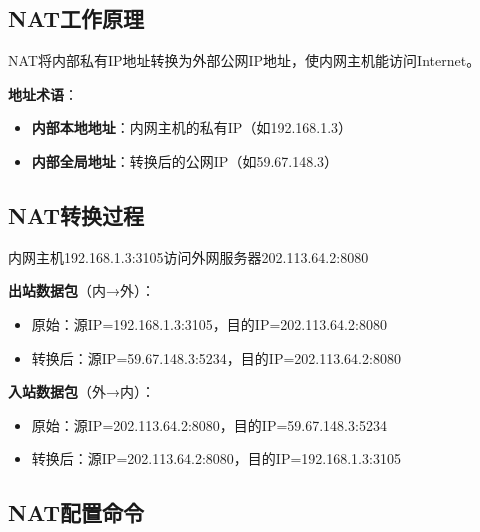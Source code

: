 \documentclass[12pt,a4paper]{ctexart}
\begin{document}
\subsection{NAT工作原理}

\begin{keybox}
NAT将内部私有IP地址转换为外部公网IP地址，使内网主机能访问Internet。

\textbf{地址术语}：
\begin{itemize}[itemsep=0pt]
    \item \textbf{内部本地地址}：内网主机的私有IP（如192.168.1.3）
    \item \textbf{内部全局地址}：转换后的公网IP（如59.67.148.3）
\end{itemize}
\end{keybox}

\subsection{NAT转换过程}

\begin{exambox}[NAT转换示例]
内网主机192.168.1.3:3105访问外网服务器202.113.64.2:8080

\textbf{出站数据包}（内→外）：
\begin{itemize}[itemsep=0pt]
    \item 原始：源IP=192.168.1.3:3105，目的IP=202.113.64.2:8080
    \item 转换后：源IP=59.67.148.3:5234，目的IP=202.113.64.2:8080
\end{itemize}

\textbf{入站数据包}（外→内）：
\begin{itemize}[itemsep=0pt]
    \item 原始：源IP=202.113.64.2:8080，目的IP=59.67.148.3:5234
    \item 转换后：源IP=202.113.64.2:8080，目的IP=192.168.1.3:3105
\end{itemize}
\end{exambox}

\subsection{NAT配置命令}
\end{document}
